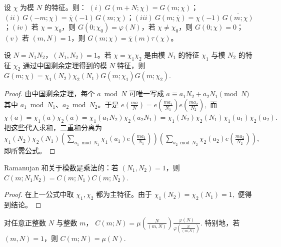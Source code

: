 \begin{theorem}
设 $\chi$ 为模 $N$ 的特征。则：
\((i)\ G(m+N;\chi)=G(m;\chi)\)；\((ii)\ G(-m;\chi)=\overline{\chi}(-1)\,G(m;\chi)\)；\((iii)\ G(m;\overline{\chi})=\chi(-1)\,\overline{G(m;\chi)}\)；\((iv)\) 若 \(\chi=\chi_0\)，则 \(G(0;\chi_0)=\varphi(N)\)，若 \(\chi\ne\chi_0\)，则 \(G(0;\chi)=0\)；\((v)\) 若 \((m,N)=1\)，则 \(G(m;\chi)=\overline{\chi}(m)\tau(\chi)\)。
\end{theorem}

\begin{theorem}[互素模数下的乘法公式]
设 $N=N_1N_2$，$(N_1,N_2)=1$。若
\(
  \chi=\chi_1\chi_2
\)
是由模 $N_1$ 的特征 $\chi_1$ 与模 $N_2$ 的特征 $\chi_2$ 通过中国剩余定理得到的模 $N$ 特征，则
\(
  G(m;\chi)
  =
  \chi_1(N_2)\chi_2(N_1)
  G(m;\chi_1)G(m;\chi_2).
\)
\end{theorem}

\begin{proof}
由中国剩余定理，每个 $a\bmod N$ 可唯一写成
\(
  a\equiv a_1N_2+a_2N_1\pmod N
\)
其中 $a_1\bmod N_1$、$a_2\bmod N_2$。于是
\(
  e\!\left(\frac{ma}{N}\right)
  =
  e\!\left(\frac{ma_1}{N_1}\right)
  e\!\left(\frac{ma_2}{N_2}\right),
\)
而
\(
  \chi(a)
  =
  \chi_1(a)\chi_2(a)
  =
  \chi_1(a_1N_2)\chi_2(a_2N_1)
  =
  \chi_1(N_2)\chi_2(N_1)\chi_1(a_1)\chi_2(a_2).
\)
把这些代入求和，二重和分离为
\(
  \chi_1(N_2)\chi_2(N_1)
  \left(\sum_{a_1\bmod N_1}\chi_1(a_1)e\!\left(\frac{ma_1}{N_1}\right)\right)
  \left(\sum_{a_2\bmod N_2}\chi_2(a_2)e\!\left(\frac{ma_2}{N_2}\right)\right),
\)
即所需公式。
\end{proof}

\begin{corollary}
Ramanujan 和关于模数是乘法的：若 $(N_1,N_2)=1$，则
\(
  C(m;N_1N_2)=C(m;N_1)C(m;N_2).
\)
\end{corollary}

\begin{proof}
在上一公式中取 $\chi_1,\chi_2$ 都为主特征。由于
\(
  \chi_1(N_2)=\chi_2(N_1)=1,
\)
便得到结论。
\end{proof}

\begin{theorem}
对任意正整数 $N$ 与整数 $m$，
\(
  C(m;N)
  =
  \mu\!\left(\frac{N}{(m,N)}\right)
  \frac{\varphi(N)}{\varphi\!\left(\frac{N}{(m,N)}\right)}.
\)
特别地，若 $(m,N)=1$，则
\(
  C(m;N)=\mu(N).
\)
\end{theorem}


